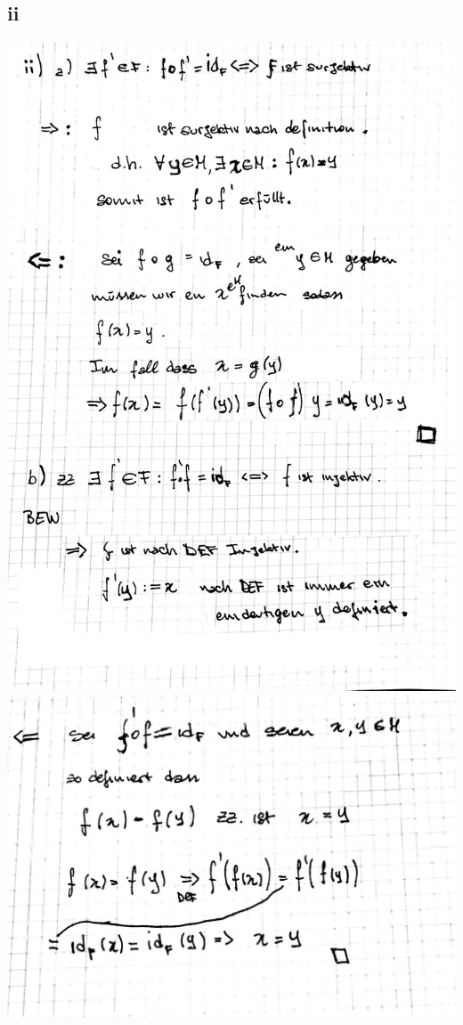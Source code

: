 \documentclass[10pt,a4paper]{article}
\begin{document}
\subsection{ii}
\includegraphics[width=\textwidth]{lat5b_4.jpg}
\includegraphics[width=\textwidth]{lat5b_5.jpg}
\end{document}
